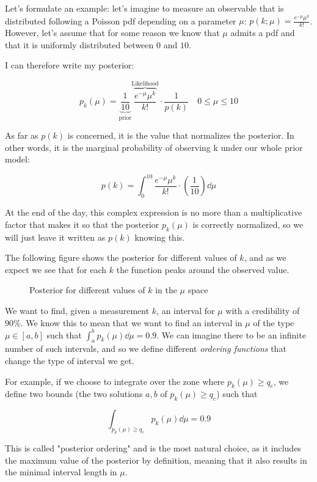 \begin{example}
	Let's formulate an example: let's imagine to measure an observable that is distributed following a Poisson pdf depending on a parameter $\mu$: $p(k;\mu) = \frac{e^{-\mu}\mu^k}{k!}$. However, let's assume that for some reason we know that $\mu$ admits a pdf and that it is uniformly distributed between $0$ and $10$. 
	
	I can therefore write my posterior:
	
	\[
	p_k(\mu) = \underbrace{\frac{1}{10}}_{\text{prior}}\overbrace{\frac{e^{-\mu}\mu^k}{k!}}^{\text{Likelihood}}\cdot\frac{1}{p(k)}\quad 0\leq\mu\leq10
	\]
	
	As far as $p(k)$ is concerned, it is the value that normalizes the posterior. In other words, it is the marginal probability of observing k under our whole prior model:
	
	\[
	p(k) = \int_0^{10} \frac{e^{-\mu}\mu^k}{k!}\cdot\left(\frac{1}{10}\right)\dd\mu
	\]
	
	At the end of the day, this complex expression is no more than a multiplicative factor that makes it so that the posterior $p_k(\mu)$ is correctly normalized, so we will just leave it written as $p(k)$ knowing this.
	
	The following figure shows the posterior for different values of $k$, and as we expect we see that for each $k$ the function peaks around the observed value.
	
	\begin{figure}[H]
		\centering
		
		\caption{Posterior for different values of $k$ in the $\mu$ space}
		\label{fig:bayes_posterior}
	\end{figure}
	
	We want to find, given a measurement $k$, an interval for $\mu$ with a credibility of $90\%$. We know this to mean that we want to find an interval in $\mu$ of the type $\mu\in[a,b]$ such that $\int_a^bp_{k}(\mu)\dd \mu= 0.9$. We can imagine there to be an infinite number of such intervals, and so we define different \emph{ordering functions} that change the type of interval we get.
	
	For example, if we choose to integrate over the zone where $p_{k}(\mu)\geq q_c$, we define two bounds (the two solutions $a,b$ of $p_{k}(\mu)\geq q_c$) such that 
	
	\[
	\int_{p_{k}(\mu)\geq q_c}p_{k}(\mu)\dd \mu = 0.9
	\]
	
	This is called "posterior ordering" and is the most natural choice, as it includes the maximum value of the posterior by definition, meaning that it also results in the minimal interval length in $\mu$.
	

\end{example}
